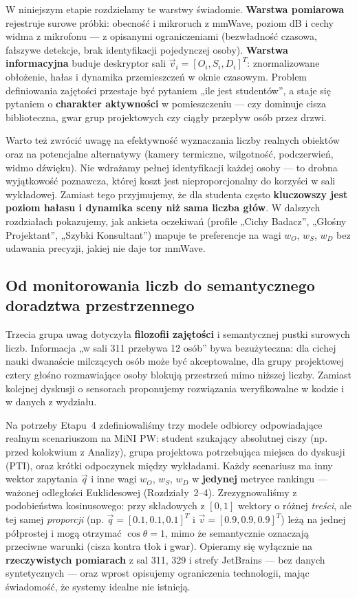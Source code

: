 \documentclass[14pt,a4paper]{extarticle}
\begin{document}
W niniejszym etapie rozdzielamy te warstwy świadomie. \textbf{Warstwa pomiarowa} rejestruje surowe próbki: obecność i mikroruch z mmWave, poziom dB i cechy widma z mikrofonu --- z opisanymi ograniczeniami (bezwładność czasowa, fałszywe detekcje, brak identyfikacji pojedynczej osoby). \textbf{Warstwa informacyjna} buduje deskryptor sali $\vec{v}_i = [O_i, S_i, D_i]^T$: znormalizowane obłożenie, hałas i dynamika przemieszczeń w oknie czasowym. Problem definiowania zajętości przestaje być pytaniem „ile jest studentów”, a staje się pytaniem o \textbf{charakter aktywności} w pomieszczeniu --- czy dominuje cisza biblioteczna, gwar grup projektowych czy ciągły przepływ osób przez drzwi.

Warto też zwrócić uwagę na efektywność wyznaczania liczby realnych obiektów oraz na potencjalne alternatywy (kamery termiczne, wilgotność, podczerwień, widmo dźwięku). Nie wdrażamy pełnej identyfikacji każdej osoby --- to drobna wyjątkowość poznawcza, której koszt jest nieproporcjonalny do korzyści w sali wykładowej. Zamiast tego przyjmujemy, że dla studenta często \textbf{kluczowszy jest poziom hałasu i dynamika sceny niż sama liczba głów}. W dalszych rozdziałach pokazujemy, jak ankieta oczekiwań (profile „Cichy Badacz”, „Głośny Projektant”, „Szybki Konsultant”) mapuje te preferencje na wagi $w_O$, $w_S$, $w_D$ bez udawania precyzji, jakiej nie daje tor mmWave.

\subsection{Od monitorowania liczb do semantycznego doradztwa przestrzennego}
Trzecia grupa uwag dotyczyła \textbf{filozofii zajętości} i semantycznej pustki surowych liczb. Informacja „w sali 311 przebywa 12 osób” bywa bezużyteczna: dla cichej nauki dwanaście milczących osób może być akceptowalne, dla grupy projektowej cztery głośno rozmawiające osoby blokują przestrzeń mimo niższej liczby. Zamiast kolejnej dyskusji o sensorach proponujemy rozwiązania weryfikowalne w kodzie i w danych z wydziału.

Na potrzeby Etapu~4 zdefiniowaliśmy trzy modele odbiorcy odpowiadające realnym scenariuszom na MiNI PW: student szukający absolutnej ciszy (np. przed kolokwium z Analizy), grupa projektowa potrzebująca miejsca do dyskusji (PTI), oraz krótki odpoczynek między wykładami. Każdy scenariusz ma inny wektor zapytania $\vec{q}$ i inne wagi $w_O$, $w_S$, $w_D$ w \textbf{jedynej} metryce rankingu --- ważonej odległości Euklidesowej (Rozdziały~2--4). Zrezygnowaliśmy z podobieństwa kosinusowego: przy składowych z $[0,1]$ wektory o różnej \emph{treści}, ale tej samej \emph{proporcji} (np. $\vec{q} = [0.1,0.1,0.1]^T$ i $\vec{v} = [0.9,0.9,0.9]^T$) leżą na jednej półprostej i mogą otrzymać $\cos\theta = 1$, mimo że semantycznie oznaczają przeciwne warunki (cisza kontra tłok i gwar). Opieramy się wyłącznie na \textbf{rzeczywistych pomiarach} z sal 311, 329 i strefy JetBrains --- bez danych syntetycznych --- oraz wprost opisujemy ograniczenia technologii, mając świadomość, że systemy idealne nie istnieją.
\end{document}
